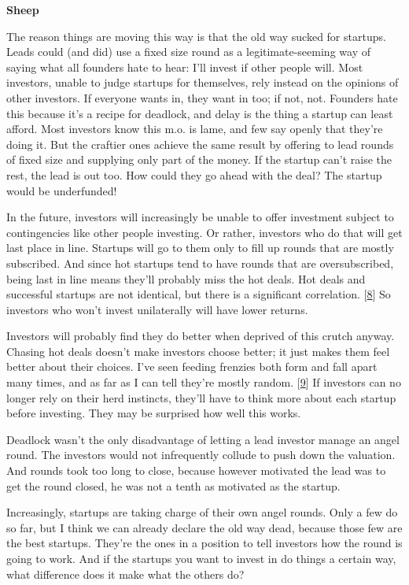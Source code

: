 \textbf{Sheep}

The reason things are moving this way is that the old way sucked for
startups. Leads could (and did) use a fixed size round as a
legitimate-seeming way of saying what all founders hate to hear: I'll
invest if other people will. Most investors, unable to judge startups
for themselves, rely instead on the opinions of other investors. If
everyone wants in, they want in too; if not, not. Founders hate this
because it's a recipe for deadlock, and delay is the thing a startup can
least afford. Most investors know this m.o. is lame, and few say openly
that they're doing it. But the craftier ones achieve the same result by
offering to lead rounds of fixed size and supplying only part of the
money. If the startup can't raise the rest, the lead is out too. How
could they go ahead with the deal? The startup would be underfunded!

In the future, investors will increasingly be unable to offer investment
subject to contingencies like other people investing. Or rather,
investors who do that will get last place in line. Startups will go to
them only to fill up rounds that are mostly subscribed. And since hot
startups tend to have rounds that are oversubscribed, being last in line
means they'll probably miss the hot deals. Hot deals and successful
startups are not identical, but there is a significant correlation.
{[}\hyperref[f8n]{8}{]} So investors who won't invest unilaterally will
have lower returns.

Investors will probably find they do better when deprived of this crutch
anyway. Chasing hot deals doesn't make investors choose better; it just
makes them feel better about their choices. I've seen feeding frenzies
both form and fall apart many times, and as far as I can tell they're
mostly random. {[}\hyperref[f9n]{9}{]} If investors can no longer rely
on their herd instincts, they'll have to think more about each startup
before investing. They may be surprised how well this works.

Deadlock wasn't the only disadvantage of letting a lead investor manage
an angel round. The investors would not infrequently collude to push
down the valuation. And rounds took too long to close, because however
motivated the lead was to get the round closed, he was not a tenth as
motivated as the startup.

Increasingly, startups are taking charge of their own angel rounds. Only
a few do so far, but I think we can already declare the old way dead,
because those few are the best startups. They're the ones in a position
to tell investors how the round is going to work. And if the startups
you want to invest in do things a certain way, what difference does it
make what the others do?

